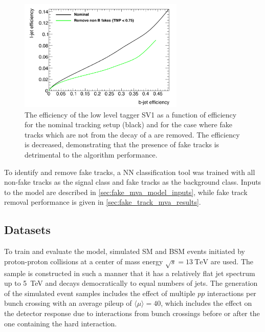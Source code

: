 \begin{figure}[!htbp]
    \centering
    \includegraphics[width=0.7\textwidth]{chapters/track_classifier/figs/sv1_perf_nofake.pdf}
    \caption{
      The \ljet efficiency of the low level tagger SV1 as a function of \bjet efficiency for the nominal tracking setup (black) and for the case where fake tracks which are not from the decay of a \bhadron are removed.
      The \ljet efficiency is decreased, demonstrating that the presence of fake tracks is detrimental to the algorithm performance.
    }
    \label{fig:sv1_perf_nofake}
\end{figure}

To identify and remove fake tracks, a NN classification tool was trained with all non-fake tracks as the signal class and fake tracks as the background class.
Inputs to the model are described in \cref{sec:fake_mva_model_inputs}, while fake track removal performance is given in \cref{sec:fake_track_mva_results}.


\subsection{Datasets}\label{sec:track_classifier_datasets}

To train and evaluate the model, simulated SM \ttbar and BSM \Zprime events initiated by proton-proton collisions at a center of mass energy $\sqrt{s} = \SI{13}{\TeV}$ are used.
The \Zprime sample is constructed in such a manner that it has a relatively flat jet \pt spectrum up to \SI{5}{\TeV} and decays democratically to equal numbers of \bcl jets.
The generation of the simulated event samples includes the effect of multiple $pp$ interactions per bunch crossing with an average pileup of $\langle \mu \rangle = 40$, which includes the effect on the detector response due to interactions from bunch crossings before or after the one containing the hard interaction.

